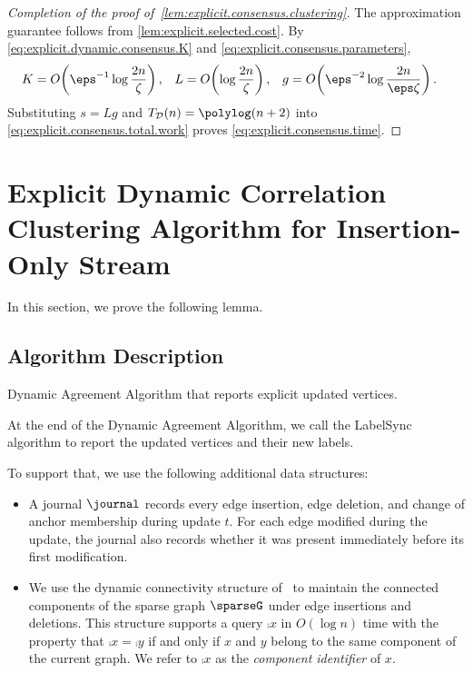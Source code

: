 \begin{proof}[Completion of the proof of~\cref{lem:explicit.consensus.clustering}]
The approximation guarantee follows from \cref{lem:explicit.selected.cost}.
By \eqref{eq:explicit.dynamic.consensus.K} and \eqref{eq:explicit.consensus.parameters},
\begin{align}
    K&=O\!\left(\eps^{-1}\log\frac{2n}{\zeta}\right),
    &L&=O\!\left(\log\frac{2n}{\zeta}\right),
    &g&=O\!\left(\eps^{-2}\log\frac{2n}{\eps\zeta}\right).
    \nonumber
\end{align}
Substituting $ s=Lg $ and $ \edTime{n}=\polylog(n+2) $ into \eqref{eq:explicit.consensus.total.work} proves \eqref{eq:explicit.consensus.time}.
\end{proof}

\section{Explicit Dynamic Correlation Clustering Algorithm for Insertion-Only Stream}\label{sec:explicit_dynamic_correlation_clustering_algorithm_for_insertion_only_stream} %

In this section, we prove the following lemma.
\ExplicitDA*

\subsection{Algorithm Description}\label{sub:algorithm_description} %


Dynamic Agreement Algorithm that reports explicit updated vertices.

At the end of the Dynamic Agreement Algorithm, we call the LabelSync algorithm to report the updated vertices and their new labels.

To support that, we use the following additional data structures:
\begin{itemize}
    \item A journal $ \journal $ records every edge insertion, edge deletion, and change of anchor membership during update $ t $.
    For each edge modified during the update, the journal also records whether it was present immediately before its first modification.
\item We use the dynamic connectivity structure of~\cite{holm2001poly} to maintain the connected components of the sparse graph $ \sparseG $ under edge insertions and deletions. This structure supports a query $ \comp{x} $ in $ O(\log n) $ time with the property that $ \comp{x}=\comp{y} $ if and only if $ x $ and $ y $ belong to the same component of the current graph. We refer to $ \comp{x} $ as the \emph{component identifier} of $ x $.
\end{itemize}

